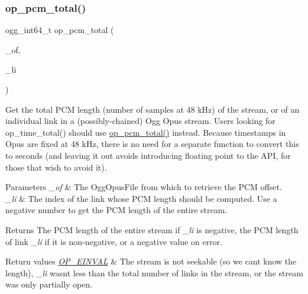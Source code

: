 \subsubsection{\texorpdfstring{op\_pcm\_total()}{op\_pcm\_total()}}
{\footnotesize\ttfamily ogg\+\_\+int64\+\_\+t op\+\_\+pcm\+\_\+total (\begin{DoxyParamCaption}\item[{const Ogg\+Opus\+File $\ast$}]{\+\_\+of,  }\item[{int}]{\+\_\+li }\end{DoxyParamCaption})}

Get the total P\+CM length (number of samples at 48 k\+Hz) of the stream, or of an individual link in a (possibly-\/chained) Ogg Opus stream. Users looking for {\ttfamily op\+\_\+time\+\_\+total()} should use \mbox{\hyperlink{group__stream__info_ga8c228c3d95f2c903ad6cfd2b78d8dad6}{op\+\_\+pcm\+\_\+total()}} instead. Because timestamps in Opus are fixed at 48 k\+Hz, there is no need for a separate function to convert this to seconds (and leaving it out avoids introducing floating point to the A\+PI, for those that wish to avoid it). 
\begin{DoxyParams}{Parameters}
{\em \+\_\+of} & The {\ttfamily Ogg\+Opus\+File} from which to retrieve the P\+CM offset. \\
\hline
{\em \+\_\+li} & The index of the link whose P\+CM length should be computed. Use a negative number to get the P\+CM length of the entire stream. \\
\hline
\end{DoxyParams}
\begin{DoxyReturn}{Returns}
The P\+CM length of the entire stream if {\itshape \+\_\+li} is negative, the P\+CM length of link {\itshape \+\_\+li} if it is non-\/negative, or a negative value on error. 
\end{DoxyReturn}

\begin{DoxyRetVals}{Return values}
{\em \mbox{\hyperlink{group__error__codes_gae0879acafe9cc0ab72462d291fdb6fb6}{O\+P\+\_\+\+E\+I\+N\+V\+AL}}} & The stream is not seekable (so we can\textquotesingle{}t know the length), {\itshape \+\_\+li} wasn\textquotesingle{}t less than the total number of links in the stream, or the stream was only partially open. \\
\hline
\end{DoxyRetVals}
\mbox{\label{group__stream__info_gab857684ab149c6225884ad94c3787561}} 
